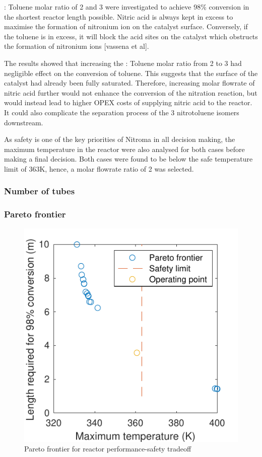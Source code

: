  : Toluene molar ratio of 2 and 3 were investigated to achieve 98\% conversion in the shortest reactor length possible. Nitric acid is always kept in excess to maximise the formation of nitronium ion on the catalyst surface. Conversely, if the toluene is in excess, it will block the acid sites on the catalyst which obstructs the formation of nitronium ions [vassena et al]. 

The results showed that increasing the  : Toluene molar ratio from 2 to 3 had negligible effect on the conversion of toluene. This suggests that the surface of the catalyst had already been fully saturated. Therefore, increasing molar flowrate of nitric acid further would not enhance the conversion of the nitration reaction, but would instead lead to higher OPEX costs of supplying nitric acid to the reactor. It could also complicate the separation process of the 3 nitrotoluene isomers downstream. 

As safety is one of the key priorities of Nitroma in all decision making, the maximum temperature in the reactor were also analysed for both cases before making a final decision. Both cases were found to be below the safe temperature limit of 363K, hence, a molar flowrate ratio of 2 was selected.

\subsubsection{Number of tubes}

\subsubsection{Pareto frontier}

\begin{figure}
    \vspace{-\intextsep}
    \includegraphics[scale=0.5]{figures/comsol-pareto.pdf}
    \caption{Pareto frontier for reactor performance-safety tradeoff}
    \label{fig:comsol-pareto}
\end{figure}

